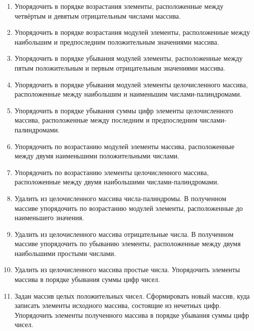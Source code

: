 \begin{enumerate}
\item Упорядочить в порядке возрастания элементы, расположенные между четвёртым и девятым отрицательным числами массива.
\item Упорядочить в порядке возрастания модулей элементы, расположенные между наибольшим и предпоследним положительным
значениями массива.
\item Упорядочить в порядке убывания модулей элементы, расположенные между пятым положительным и первым отрицательным
значениями массива.
\item Упорядочить в порядке убывания модулей элементы целочисленного массива, расположенные между наибольшим и
наименьшим числами-палиндромами.
\item Упорядочить в порядке убывания суммы цифр элементы целочисленного массива, расположенные между последним и
предпоследним числами-палиндромами.
\item Упорядочить по возрастанию модулей элементы массива, расположенные между двумя наименьшими положительными числами.
\item Упорядочить по возрастанию элементы целочисленного массива, расположенные между двумя наибольшими
числами-палиндромами.
\item Удалить из целочисленного массива числа-палиндромы. В полученном массиве упорядочить по возрастанию модулей
элементы, расположенные до наименьшего значения.
\item Удалить из целочисленного массива отрицательные числа. В полученном массиве упорядочить по убыванию элементы,
расположенные между двумя наибольшими простыми числами.
\item Удалить из целочисленного массива простые числа. Упорядочить элементы массива в порядке убывания суммы цифр чисел.
\item Задан массив целых положительных чисел. Сформировать новый массив, куда записать элементы исходного массива,
состоящие из нечетных цифр. Упорядочить элементы полученного массива в порядке убывания суммы цифр чисел.
\end{enumerate}
